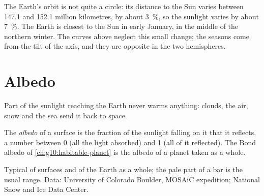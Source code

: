 \begin{remark}\label{rem:g10:earth-energy-budget:distance}
The Earth's orbit is not quite a circle: its distance to the Sun varies
between \num{147.1} and \num{152.1} million kilometres, by about
\qty{3}{\percent}, so the sunlight varies by about \qty{7}{\percent}. The
Earth is closest to the Sun in early January, in the middle of the northern
winter. The curves above neglect this small change; the seasons come from
the tilt of the axis, and they are opposite in the two hemispheres.
\end{remark}

\section{Albedo}

Part of the sunlight reaching the Earth never warms anything: clouds, the air,
snow and the sea send it back to space.

\begin{definition}[Albedo]\label{def:g10:earth-energy-budget:albedo}
The \emph{albedo} of a surface is the fraction of the sunlight
falling on it that it reflects, a number between 0 (all the light absorbed)
and 1 (all of it reflected). The Bond albedo of \cref{ch:g10:habitable-planet}
is the albedo of a planet taken as a whole.
\end{definition}

\begin{omfigure}

{\small Typical  of surfaces and of the Earth as a whole; the pale
part of a bar is the usual range. Data: University of Colorado Boulder,
MOSAiC expedition; National Snow and Ice Data Center.}
\end{omfigure}

